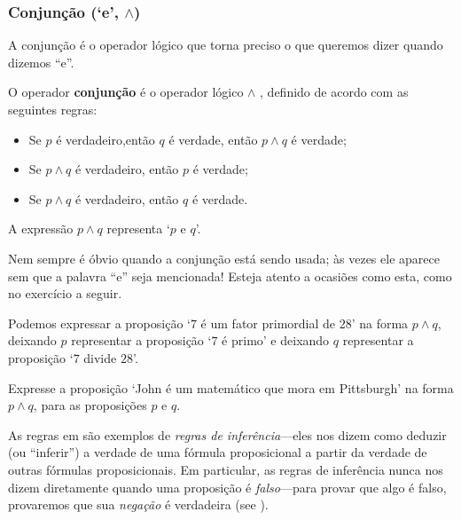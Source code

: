 \subsubsection*{Conjunção (`e', $\wedge$)}

A conjunção é o operador lógico que torna preciso o que queremos dizer quando dizemos “e”.
\begin{idefinition}
\label{defConjunction}
O operador \textbf{conjunção} é o operador lógico $\wedge$ , definido de acordo com as seguintes regras:
\begin{itemize}
\item \introrule{\wedge} Se $p$ é verdadeiro,então $q$ é verdade, então $p \wedge q$ é verdade;
\item {} Se $p \wedge q$ é verdadeiro, então $p$ é verdade;
\item {} Se $p \wedge q$ é verdadeiro, então $q$ é verdade.
\end{itemize}
A expressão $p \wedge q$ representa `$p$ e $q$'.
\end{idefinition}

Nem sempre é óbvio quando a conjunção está sendo usada; às vezes ele aparece sem que a palavra “e” seja mencionada! Esteja atento a ocasiões como esta, como no exercício a seguir.

\begin{example}
\label{exSevenDividesTwentyEightConjunction}
Podemos expressar a proposição `$7$ é um fator primordial de $28$' na forma $p \wedge q$, deixando $p$ representar a proposição `$7$ é primo' e deixando $q$ representar a proposição `$7$ divide $28$'.
\end{example}

\begin{exercise}
\label{exJohnMathematicianPittsburgh}

Expresse a proposição `John é um matemático que mora em Pittsburgh' na forma $p \wedge q$, para as proposições $p$ e $q$.\end{exercise}

As regras em  são exemplos de \textit{regras de inferência}---eles nos dizem como deduzir (ou “inferir”) a verdade de uma fórmula proposicional a partir da verdade de outras fórmulas proposicionais. Em particular, as regras de inferência nunca nos dizem diretamente quando uma proposição é \textit{falso}---para provar que algo é falso, provaremos que sua \textit{negação} é verdadeira (see ).

